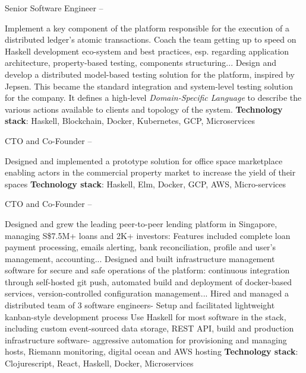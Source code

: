 \documentclass[a4paper,MMMyyyy,nonstopmode]{simpleresumecv}
\begin{document}
\begin{Body}
\Entry
Senior Software Engineer
\hfill
{} --
\begin{Detail}
  \BulletItem
  Implement a key component of the platform responsible for the execution of a distributed ledger's atomic transactions.
  \BulletItem
  Coach the team getting up to speed on Haskell development eco-system and best practices, esp. regarding application architecture, property-based testing, components structuring...
  \BulletItem
  Design and develop a distributed model-based testing solution for the platform, inspired by Jepsen. This became the standard integration and system-level testing solution for the company. It defines a high-level \emph{Domain-Specific Language} to describe the various actions available to clients and topology of the system.
  \BulletItem
  \textbf{Technology stack}: Haskell, Blockchain, Docker, Kubernetes, GCP, Microservices
\end{Detail}

\Entry
CTO and Co-Founder
\hfill
{} --
\begin{Detail}

  \BulletItem Designed and implemented a prototype solution for office space marketplace enabling actors in the commercial property market to increase the yield of their spaces
  \BulletItem \textbf{Technology stack}: Haskell, Elm, Docker, GCP, AWS, Micro-services
\end{Detail}

\Entry
CTO and Co-Founder
\hfill
{} --
\begin{Detail}

  \BulletItem Designed and grew the leading peer-to-peer lending platform in Singapore, managing S\$7.5M+ loans and 2K+ investors: Features included complete loan payment processing, emails alerting, bank reconciliation, profile and user’s management, accounting...
  \BulletItem Designed and built infrastructure management software for secure and safe operations of the platform: continuous integration through self-hosted git push, automated build and deployment of docker-based services, version-controlled configuration management...
  \BulletItem Hired and managed a distributed team of 3 software engineers- Setup and facilitated lightweight kanban-style development process
  \BulletItem Use Haskell for most software in the stack, including custom event-sourced data storage, REST API, build and production infrastructure software- aggressive automation for provisioning and managing hosts, Riemann monitoring, digital ocean and AWS hosting
  \BulletItem \textbf{Technology stack}: Clojurescript, React, Haskell, Docker, Microservices


\end{Detail}
\end{Body}
\end{document}
